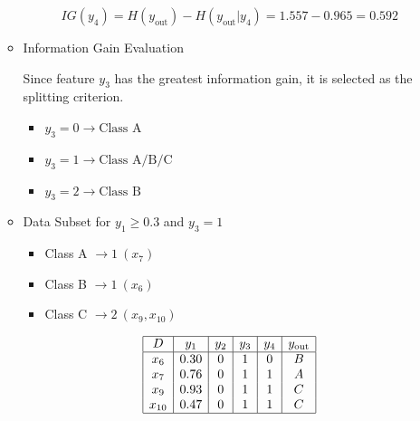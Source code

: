 \documentclass[12pt]{article}
\begin{document}
\begin{enumerate}[leftmargin=\labelsep, label=\textbf{\arabic*.)}]
\begin{itemize}
                    \[
                        IG(y_4) = H(y_{\text{out}}) - H(y_{\text{out}}|y_4) = 1.557 - 0.965 = 0.592
                    \]

              \item Information Gain Evaluation

                    Since feature \( y_3 \) has the greatest information gain, it is selected as the splitting criterion.

                    \begin{itemize}
                        \item \( y_3 = 0 \rightarrow \text{Class A} \)
                        \item \( y_3 = 1 \rightarrow \text{Class A/B/C} \)
                        \item \( y_3 = 2 \rightarrow \text{Class B} \)
                    \end{itemize}

              \item Data Subset for \( y_1 \geq 0.3 \) and \( y_3 = 1 \) \\
                    \vspace{0.5em}
                    \begin{minipage}{0.30\textwidth}
                        \begin{itemize}
                            \item Class A $\rightarrow 1 \ (x_7)$
                            \item Class B $\rightarrow 1 \ (x_6)$
                            \item Class C $\rightarrow 2 \ (x_9, x_{10})$
                        \end{itemize}
                    \end{minipage}
                    \begin{minipage}{0.45\textwidth}
                        \[
                            \begin{array}{|c|c|c|c|c|c|}
                                \hline
                                D      & y_1  & y_2 & y_3 & y_4 & y_{\text{out}} \\
                                \hline
                                x_6    & 0.30 & 0   & 1   & 0   & B              \\
                                x_7    & 0.76 & 0   & 1   & 1   & A              \\
                                x_9    & 0.93 & 0   & 1   & 1   & C              \\
                                x_{10} & 0.47 & 0   & 1   & 1   & C              \\
                                \hline
                            \end{array}
                        \]
                    \end{minipage}


\end{itemize}
\end{enumerate}
\end{document}
